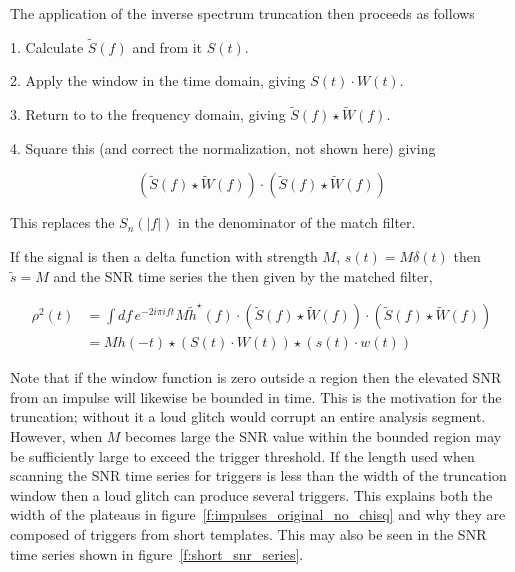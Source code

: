 The application of the inverse spectrum truncation then proceeds as
follows 

1. Calculate $\tilde{S}(f)$ and from it $S(t)$.

2. Apply the window in the time domain, giving $S(t) \cdot W(t)$.

3. Return to to the frequency domain, giving $\tilde{S}(f) \star
\tilde{W}(f)$.

4. Square this (and correct the normalization, not shown here) giving 

\begin{equation*}
(\tilde{S}(f) \star \tilde{W}(f)) \cdot (\tilde{S}(f) \star \tilde{W}(f)) 
\end{equation*}

This replaces the $S_n(|f|)$ in the denominator of the match filter.

If the signal is then a delta function with strength $M$, $s(t) = M
\delta(t)$ then $\tilde{s} = M$  and the SNR time series the then
given by the matched filter,


\begin{align*}
\rho^2(t) &= \int df\, e^{-2 i\pi i f t} M \tilde{h}^\star(f) \cdot
(\tilde{S}(f) \star \tilde{W}(f)) \cdot 
(\tilde{S}(f) \star \tilde{W}(f)) \\
&= M h(-t) \star
(S(t) \cdot W(t)) \star
(s(t) \cdot w(t))
\end{align*}

Note that if the window function is zero outside a region then the
elevated SNR from an impulse will likewise be bounded in time.  This
is the motivation for the truncation; without it a loud glitch would
corrupt an entire analysis segment.  However, when $M$ becomes large
the SNR value within the bounded region may be sufficiently large to
exceed the trigger threshold.  If the length used when scanning the
SNR time series for triggers is less than the width of the truncation
window then a loud glitch can produce several triggers.  This explains
both the width of the plateaus in
figure~\ref{f:impulses_original_no_chisq} and why they are composed of
triggers from short templates.  This may also be seen in the SNR time
series shown in figure~\ref{f:short_snr_series}.

